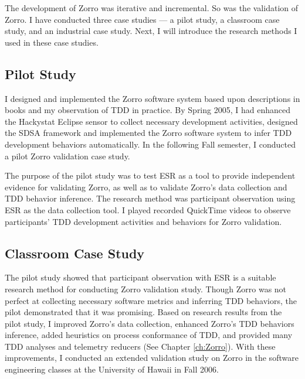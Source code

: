 The development of Zorro was iterative and incremental. So was the validation of Zorro. I have conducted three case studies --- a pilot study, a classroom case study, and an industrial case study. Next, I will introduce the research methods I used in these case studies.

\subsection{Pilot Study}

I designed and implemented the Zorro software system based upon descriptions in books \cite{Beck:03,Astels:03,Newkirk:04,Link:03,Hunt:03} and my observation of TDD in practice. By Spring 2005, I had enhanced the Hackystat Eclipse sensor to collect necessary development activities, designed the SDSA  framework and implemented the Zorro software system to infer TDD development behaviors automatically. In the following Fall semester, I conducted a pilot Zorro validation case study.

The purpose of the pilot study was to test ESR as a tool to provide independent evidence for validating Zorro, as well as to validate Zorro's data collection and TDD behavior inference. The research method was participant observation using ESR as the data collection tool. I played recorded QuickTime videos to observe participants' TDD development activities and behaviors for Zorro validation. 

\subsection{Classroom Case Study}
The pilot study showed that participant observation with ESR is a suitable research method for conducting Zorro validation study. Though Zorro was not perfect at collecting necessary software metrics and inferring TDD behaviors, the pilot demonstrated that it was promising. Based on research results from the pilot study, I improved Zorro's data collection, enhanced Zorro's TDD behaviors inference, added heuristics on process conformance of TDD, and provided many TDD analyses and telemetry reducers (See Chapter \ref{ch:Zorro}). With these improvements, I conducted an extended validation study on Zorro in the software engineering classes at the University of Hawaii in Fall 2006. 

